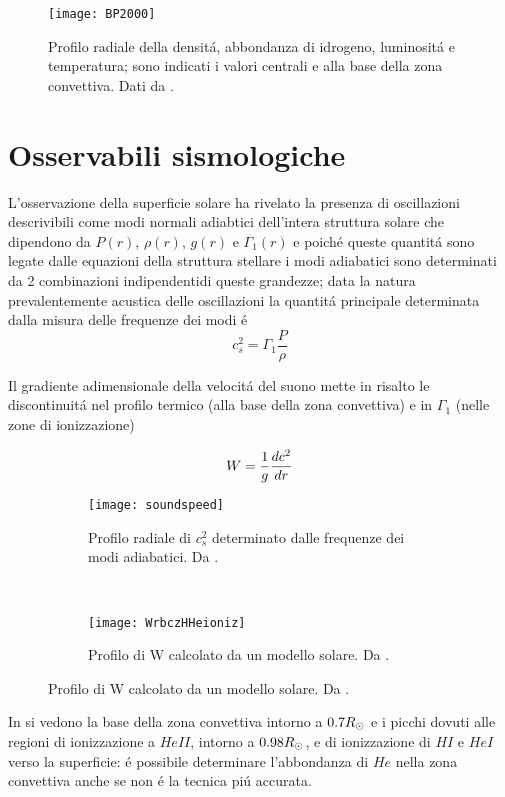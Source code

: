 \documentclass[../main.tex]{subfiles}
\begin{document}
\begin{figure}[!h]
\texttt{[image: BP2000]}
\caption{Profilo radiale della densit\'a, abbondanza di idrogeno, luminosit\'a e temperatura; sono indicati i valori centrali e alla base della zona convettiva. Dati da \cite{BP2000}.}
\end{figure}

\section{Osservabili sismologiche}

L'osservazione della superficie solare ha rivelato la presenza di oscillazioni descrivibili come modi normali adiabtici dell'intera struttura solare che dipendono da $P(r)$, $\rho(r)$, $g(r)$ e $\Gamma_1(r)$ e poich\'e queste quantit\'a sono legate dalle equazioni della struttura stellare i modi adiabatici sono determinati da 2 combinazioni indipendentidi queste grandezze; data la natura prevalentemente acustica delle oscillazioni la quantit\'a principale determinata dalla misura delle frequenze dei modi \'e
\begin{equation}
c_s^2=\Gamma_1\frac{P}{\rho}
\end{equation}

Il gradiente adimensionale della velocit\'a del suono mette in risalto le discontinuit\'a nel profilo termico (alla base della zona convettiva) e in $\Gamma_1$ (nelle zone di ionizzazione)

\begin{equation}
W=\frac{1}{g}\TDy{r}{c^2}
\end{equation}

\begin{figure}[!h]
\begin{subfigure}[r]{0.4\textwidth}
        \texttt{[image: soundspeed]}
        \caption{Profilo radiale di $c_s^2$ determinato dalle frequenze dei modi adiabatici. Da \cite{christensen1985speed}.}
    \end{subfigure}
~
\begin{subfigure}[r]{0.6\textwidth}
        \texttt{[image: WrbczHHeioniz]}\label{fig:dlessc}
        \caption{Profilo di W calcolato da un modello solare. Da \cite{basu2008helioseismology}.}
    \end{subfigure}
\end{figure}

In  si vedono la base della zona convettiva intorno a $0.7\rsun{}$ e i picchi dovuti alle regioni di ionizzazione a $HeII$, intorno a $0.98\rsun{}$, e di ionizzazione di $HI$ e $HeI$ verso la superficie: \'e possibile determinare l'abbondanza di $He$ nella zona convettiva anche se non \'e la tecnica pi\'u accurata.
\end{document}
